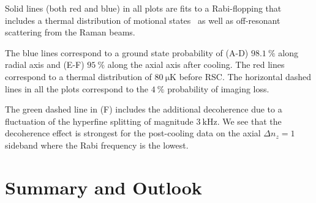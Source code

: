 \begin{FPfigure}
{    Solid lines (both red and blue) in all plots are fits to a Rabi-flopping
    that includes a thermal distribution of motional states~\cite{meekhof_generation_1996}
    as well as off-resonant scattering from the Raman beams.

    The blue lines correspond to a ground state probability of (A-D) $98.1~\%$ along radial axis
    and (E-F) $95~\%$ along the axial axis after cooling.
    The red lines correspond to a thermal distribution of $80~\mathrm{\mu K}$ before RSC.
    The horizontal dashed lines in all the plots correspond to the $4~\%$ probability
    of imaging loss.

    The green dashed line in (F) includes the additional decoherence due to
    a fluctuation of the hyperfine splitting of magnitude $3~\mathrm{kHz}$.
    We see that the decoherence effect is strongest for the post-cooling data on
    the axial $\Delta n_z=1$ sideband where the Rabi frequency is the lowest.
    \label{fig:rsc:na-rabi-flop}}
\end{FPfigure}

\section{Summary and Outlook}

